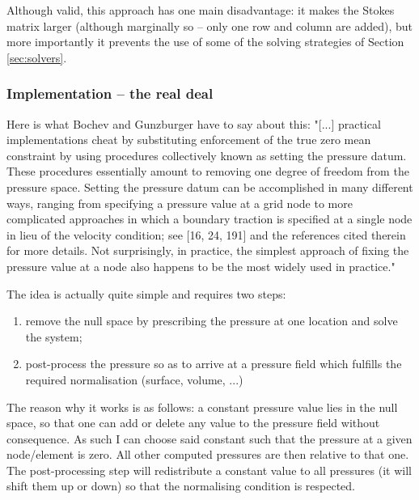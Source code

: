 Although valid, this approach has one main disadvantage: it makes the Stokes matrix larger (although
marginally so -- only one row and column are added), but more importantly it prevents the use of some
of the solving strategies of Section \ref{sec:solvers}.


\subsubsection{Implementation -- the real deal}

Here is what Bochev and Gunzburger \cite[Section 7.6.4]{bogu09} have to say about this:
"[...] practical implementations cheat by substituting enforcement of the true zero mean constraint by using
procedures collectively known as setting the pressure datum. These procedures essentially 
amount to removing one degree of freedom from the pressure space.
Setting the pressure datum can be accomplished in many different ways, ranging
from specifying a pressure value at a grid node to more complicated approaches in
which a boundary traction is specified at a single node in lieu of the velocity condition; 
see [16, 24, 191] and the references cited therein for more details. Not surprisingly, 
in practice, the simplest approach of fixing the pressure value at a node also
happens to be the most widely used in practice."




The idea is actually quite simple and requires two steps:
\begin{enumerate}
\item remove the null space by prescribing the pressure at one location and solve the system;
\item post-process the pressure so as to arrive at a pressure field which fulfills the required normalisation (surface, volume, ...)
\end{enumerate}

The reason why it works is as follows: a constant pressure value lies in the null space, so that one can 
add or delete any value to the pressure field without consequence. As such I can choose said constant such that 
the pressure at a given node/element is zero. All other computed pressures are then relative to that one. 
The post-processing step will redistribute a constant value to all pressures (it will shift them up or down)
so that the normalising condition is respected. 





